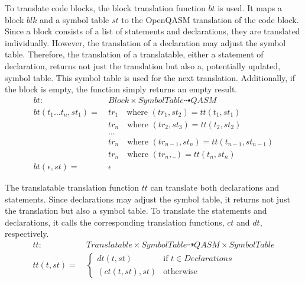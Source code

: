 To translate code blocks, the block translation function $bt$ is used. It maps a block $blk$ and a symbol table $st$ to the OpenQASM translation of the code block. Since a block consists of a list of statements and declarations, they are translated individually. However, the translation of a declaration may adjust the symbol table. Therefore, the translation of a translatable, \ie either a statement of declaration, returns not just the translation but also a, potentially updated, symbol table. This symbol table is used for the next translation. Additionally, if the block is empty, the function simply returns an empty result. 
\begin{align*}
    bt : \ & Block \times SymbolTable \dashrightarrow QASM\\
    bt(t_1 \dots t_n, st_1) = \ &  tr_1 \quad \text{where } (tr_1, st_2) = tt(t_1, st_1)\\
    & tr_n \quad \text{where } (tr_2, st_3) = tt(t_2, st_2)\\
    & \dots\\
    & tr_n \quad \text{where } (tr_{n - 1}, st_n) = tt(t_{n - 1}, st_{n - 1})\\
    & tr_n \quad \text{where } (tr_n, \_) = tt(t_n, st_n)\\
    bt(\epsilon, st) = \ &  \epsilon 
\end{align*}

The translatable translation function $tt$ can translate both declarations and statements. Since declarations may adjust the symbol table, it returns not just the translation but also a symbol table. To translate the statements and declarations, it calls the corresponding translation functions, $ct$ and $dt$, respectively.
\begin{align*}
    tt : \ & Translatable \times SymbolTable \dashrightarrow QASM \times SymbolTable\\
    tt(t, st) = \ & \begin{cases}
        dt(t, st)  \quad &\text{if } t \in Declarations\\
        (ct(t, st), st) &\text{otherwise }
    \end{cases}  
\end{align*}

